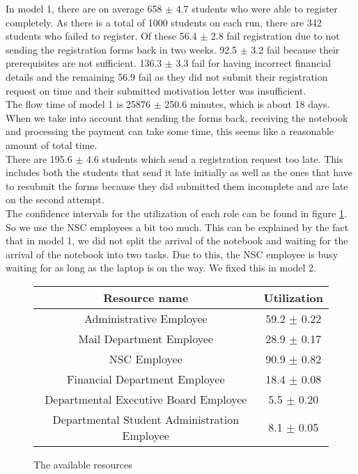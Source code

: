 In model 1, there are on average 658 $\pm$ 4.7 students who were able to register completely. As there is a total of 1000 students on each run, there are 342 students who failed to register. Of these 56.4 $\pm$ 2.8 fail registration due to not sending the registration forms back in two weeks. 92.5 $\pm$ 3.2 fail because their prerequisites are not sufficient. 136.3 $\pm$ 3.3 fail for having incorrect financial details and the remaining 56.9 fail as they did not submit their registration request on time and their submitted motivation letter was insufficient.\\

The flow time of model 1 is 25876 $\pm$ 250.6 minutes, which is about 18 days. When we take into account that sending the forms back, receiving the notebook and processing the payment can take some time, this seems like a reasonable amount of total time.\\

There are 195.6 $\pm$ 4.6 students which send a registration request too late. This includes both the students that send it late initially as well as the ones that have to resubmit the forms because they did submitted them incomplete and are late on the second attempt.\\

The confidence intervals for the utilization of each role can be found in figure \ref{fig:resourcesutil1}. So we use the NSC employees a bit too much. This can be explained by the fact that in model 1, we did not split the arrival of the notebook and waiting for the arrival of the notebook into two tasks. Due to this, the NSC employee is busy waiting for as long as the laptop is on the way. We fixed this in model 2.

\begin{figure}[h!]
	\centering
	\begin{tabular}{ | c | c | }
		\hline
		\textbf{Resource name} & \textbf{Utilization} \\ \hline\hline
		Administrative Employee & 59.2 $\pm$ 0.22 \\ \hline		
		Mail Department Employee & 28.9 $\pm$ 0.17 \\ \hline
		NSC Employee & 90.9 $\pm$ 0.82 \\ \hline
		Financial Department Employee & 18.4 $\pm$ 0.08 \\ \hline
		Departmental Executive Board Employee & 5.5 $\pm$ 0.20 \\ \hline
		Departmental Student Administration Employee & 8.1 $\pm$ 0.05 \\ \hline
		\hline
	\end{tabular}
	\caption{The available resources}
	\label{fig:resourcesutil1}
\end{figure}
